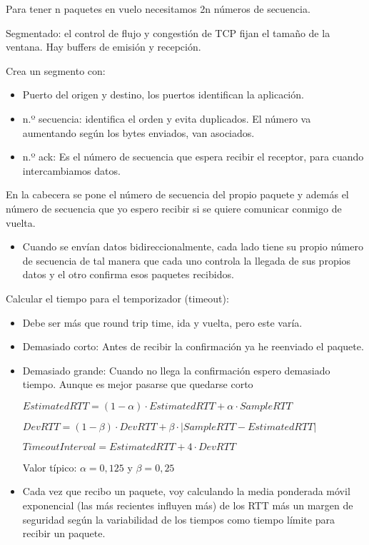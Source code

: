 \documentclass[12pt, twoside, openright]{report} %
\begin{document}
Para tener n paquetes en vuelo necesitamos 2n números de secuencia.

Segmentado: el control de flujo y congestión de TCP fijan el tamaño
de la ventana. Hay buffers de emisión y recepción.

Crea un segmento con:

\begin{itemize}
	\item Puerto del origen y destino, los puertos identifican la
	      aplicación.
	\item n.º secuencia: identifica el orden y evita duplicados. El número va
	      aumentando según los bytes enviados, van asociados.
	\item n.º ack: Es el número de secuencia que espera recibir el receptor,
	      para cuando intercambiamos datos.
\end{itemize}
\begin{figure}[H]
	{\def\svgwidth{1.2\textwidth}
		}
\end{figure}
\pagebreak
En la cabecera se pone el número de secuencia del propio paquete y
además el número de secuencia que yo espero recibir si se quiere
comunicar conmigo de vuelta.

\begin{itemize}
	\item Cuando se envían datos bidireccionalmente, cada lado tiene su
	      propio número de secuencia de tal manera que cada uno controla la
	      llegada de sus propios datos y el otro confirma esos paquetes
	      recibidos.
\end{itemize}

Calcular el tiempo para el temporizador (timeout):

\begin{itemize}
	\item Debe ser más que round trip time, ida y vuelta, pero este varía.
	\item Demasiado corto: Antes de recibir la confirmación ya he reenviado
	      el paquete.
	\item Demasiado grande: Cuando no llega la confirmación espero demasiado
	      tiempo. Aunque es mejor pasarse que quedarse corto

	      $\textit{EstimatedRTT}=(1-\alpha)\cdot \textit{EstimatedRTT} + \alpha \cdot \textit{SampleRTT}$

	      $\textit{DevRTT} = (1-\beta)\cdot \textit{DevRTT} + \beta \cdot |\textit{SampleRTT}-\textit{EstimatedRTT}|$

	      $\textit{TimeoutInterval} = \textit{EstimatedRTT} + 4 \cdot \textit{DevRTT}$

	      Valor típico: $\alpha = 0,125$ y $\beta = 0,25$
	\item Cada vez que recibo un paquete, voy calculando la media ponderada
	      móvil exponencial (las más recientes influyen más) de los RTT más
	      un margen de seguridad según la variabilidad de los tiempos como
	      tiempo límite para recibir un paquete.
\end{itemize}
\end{document}

